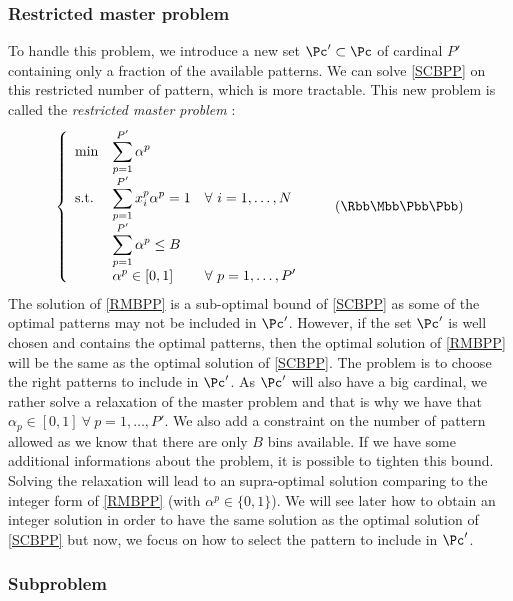\subsubsection{Restricted master problem}

To handle this problem, we introduce a new set $\Pc' \subset \Pc$ of cardinal $P'$ containing only a fraction of the available patterns. We can solve \eqref{SCBPP} on this restricted number of pattern, which is more tractable. This new problem is called the \textit{restricted master problem} :
\begin{equation}
	\label{RMBPP}
	\left \{
	\begin{array}{*5{>{\displaystyle}l}}
	\min & \sum_{p=1}^{P'} \alpha^p \\
	\st & \sum_{p=1}^{P'} x_i^p\alpha^p = 1 & \forall \ i = 1,\dots,N \\
	& \sum_{p=1}^{P'} \alpha^p \leq B \\
	& \alpha^{p} \in [0,1] &  \forall \ p = 1,\dots,P'
	\end{array}
	\right.
	\tag{$\Rbb\Mbb\Bbb\Pbb\Pbb$}
\end{equation}
The solution of \eqref{RMBPP} is a sub-optimal bound of \eqref{SCBPP} as some of the optimal patterns may not be included in $\Pc'$. However, if the set $\Pc'$ is well chosen and contains the optimal patterns, then the optimal solution of \eqref{RMBPP} will be the same as the optimal solution of \eqref{SCBPP}. The problem is to choose the right patterns to include in $\Pc'$. As $\Pc'$ will also have a big cardinal, we rather solve a relaxation of the master problem and that is why we have that $\alpha_{p} \in [0,1] \ \forall \ p = 1,\dots,P'$. We also add a constraint on the number of pattern allowed as we know that there are only $B$ bins available. If we have some additional informations about the problem, it is possible to tighten this bound. Solving the relaxation will lead to an supra-optimal solution comparing to the integer form of \eqref{RMBPP} (with $ \alpha^{p} \in \{0,1\}$). We will see later how to obtain an integer solution in order to have the same solution as the optimal solution of \eqref{SCBPP} but now, we focus on how to select the pattern to include in $\Pc'$.

\subsubsection{Subproblem}
\label{subproblem}

